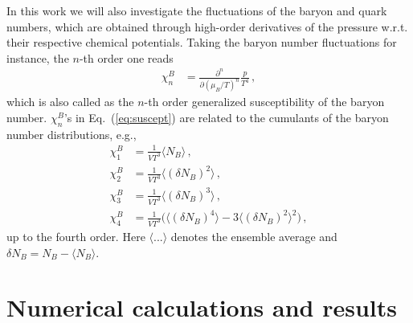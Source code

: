 \documentclass[%
reprint,
superscriptaddress,
showpacs,preprintnumbers,
 amsmath,amssymb,
 aps,
prd,
]{revtex4-1}
\def\Eq#1{Eq.~(\ref{#1})}
\begin{document}
In this work we will also investigate the fluctuations of the baryon and quark numbers, which are obtained through high-order derivatives of the pressure w.r.t. their respective chemical potentials. Taking the baryon number fluctuations for instance, the $n$-th order one reads
\begin{align}
   \chi_n^{B}&=\frac{\partial^n}{\partial (\mu_B/T)^n}\frac{p}{T^4}\,,\label{eq:suscept}
\end{align}
which is also called as the $n$-th order generalized susceptibility of the baryon number. $ \chi_n^{B}$'s in \Eq{eq:suscept} are related to the cumulants of the baryon number distributions, e.g.,
\begin{align}
  \chi_1^B&=\frac{1}{VT^3}\langle N_B \rangle\,,\\[2ex]
  \chi_2^B&=\frac{1}{VT^3}\langle(\delta N_B)^2\rangle\,,\\[2ex]
  \chi_3^B&=\frac{1}{VT^3}\langle(\delta N_B)^3\rangle\,,\\[2ex]
  \chi_4^B&=\frac{1}{VT^3}\Big(\langle(\delta N_B)^4\rangle-3\langle(\delta N_B)^2\rangle^2\Big)\,,
\end{align}
up to the fourth order. Here $\langle ...\rangle$ denotes the ensemble average and $\delta N_B=N_B-\langle N_B\rangle$.



\section{Numerical calculations and results}
\label{sec:num}
\end{document}
